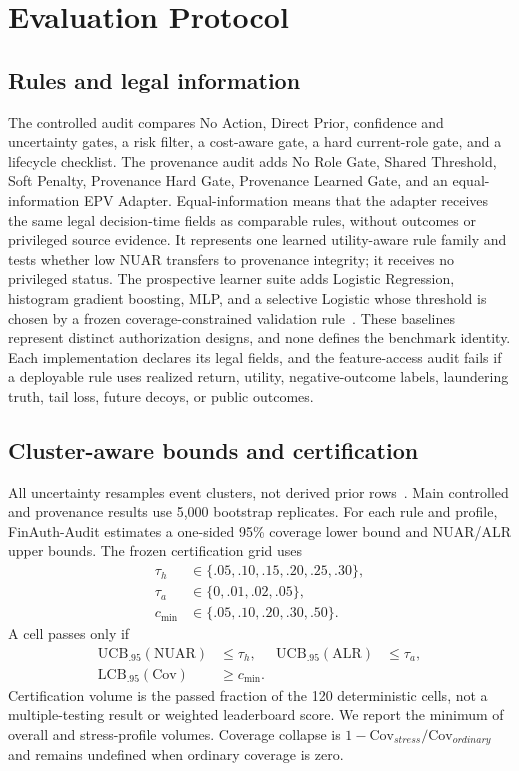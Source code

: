 \section{Evaluation Protocol}

\subsection{Rules and legal information}
The controlled audit compares No Action, Direct Prior, confidence and uncertainty gates, a risk filter, a cost-aware gate, a hard current-role gate, and a lifecycle checklist. The provenance audit adds No Role Gate, Shared Threshold, Soft Penalty, Provenance Hard Gate, Provenance Learned Gate, and an equal-information EPV Adapter. Equal-information means that the adapter receives the same legal decision-time fields as comparable rules, without outcomes or privileged source evidence. It represents one learned utility-aware rule family and tests whether low NUAR transfers to provenance integrity; it receives no privileged status. The prospective learner suite adds Logistic Regression, histogram gradient boosting, MLP, and a selective Logistic whose threshold is chosen by a frozen coverage-constrained validation rule~\cite{elyaniv2010foundations,geifman2017selective}. These baselines represent distinct authorization designs, and none defines the benchmark identity. Each implementation declares its legal fields, and the feature-access audit fails if a deployable rule uses realized return, utility, negative-outcome labels, laundering truth, tail loss, future decoys, or public outcomes.

\subsection{Cluster-aware bounds and certification}
All uncertainty resamples event clusters, not derived prior rows~\cite{cameron2008bootstrap}. Main controlled and provenance results use 5,000 bootstrap replicates. For each rule and profile, FinAuth-Audit estimates a one-sided 95\% coverage lower bound and NUAR/ALR upper bounds. The frozen certification grid uses
\[
\begin{aligned}
\tau_h&\in\{.05,.10,.15,.20,.25,.30\},\\
\tau_a&\in\{0,.01,.02,.05\},\\
c_{\min}&\in\{.05,.10,.20,.30,.50\}.
\end{aligned}
\]
A cell passes only if
\[
 \begin{aligned}
 \mathrm{UCB}_{.95}(\mathrm{NUAR})&\le\tau_h, &
 \mathrm{UCB}_{.95}(\mathrm{ALR})&\le\tau_a,\\
 \mathrm{LCB}_{.95}(\mathrm{Cov})&\ge c_{\min}.
 \end{aligned}
\]
Certification volume is the passed fraction of the 120 deterministic cells, not a multiple-testing result or weighted leaderboard score. We report the minimum of overall and stress-profile volumes. Coverage collapse is $1-\mathrm{Cov}_{stress}/\mathrm{Cov}_{ordinary}$ and remains undefined when ordinary coverage is zero.

